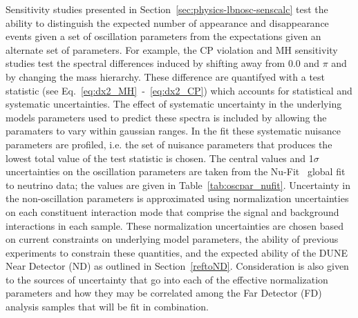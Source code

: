 Sensitivity studies presented in Section~\ref{sec:physics-lbnosc-senscalc} test the ability to distinguish
the expected number of \nue appearance and \numu disappearance events given a set of oscillation parameters
from the expectations given an alternate set of parameters. For example, the CP violation and MH sensitivity
studies test the spectral differences induced by shifting \deltacp away from 0.0 and $\pi$ and by changing the
mass hierarchy. These difference are quantifyed with a test statistic (see Eq.~\ref{eq:dx2_MH}~-~\ref{eq:dx2_CP}) 
which accounts for statistical and systematic uncertainties. 
The effect of systematic uncertainty in the underlying models parameters used to 
predict these spectra is included by allowing the paramaters to vary within gaussian ranges. In the fit
these systematic nuisance parameters are profiled, i.e. the set of nuisance parameters that produces the
lowest total value of the test statistic is chosen.  The central values and 1$\sigma$ uncertainties on the oscillation
parameters are taken from the Nu-Fit~\cite{Gonzalez-Garcia:2014bfa} global fit to neutrino data; the values are
given in Table~\ref{tab:oscpar_nufit}. Uncertainty in the non-oscillation parameters is approximated using
normalization uncertainties on each constituent interaction mode that comprise the signal and background
interactions in each sample. These normalization uncertainties are chosen based on
current constraints on underlying model parameters, the ability of previous experiments to constrain
these quantities, and the expected ability of the DUNE Near Detector (ND) as outlined in Section~\ref{reftoND}.
Consideration is also given to the sources of uncertainty that go into each of the effective normalization
parameters and how they may be correlated among the Far Detector (FD) analysis samples that will be fit in
combination.


